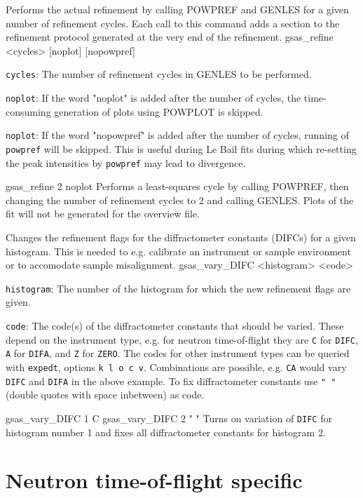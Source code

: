 {
Performs the actual refinement by calling POWPREF and GENLES for a given number of refinement cycles. Each call to this command adds a section to the refinement protocol generated at the very end of the refinement.
}{
gsas\_refine <cycles> [noplot] [nopowpref]
}{
\item \texttt{cycles}: The number of refinement cycles in GENLES to be performed.
\item \texttt{noplot}: If the word "noplot" is added after the number of cycles, the time-consuming generation of plots using POWPLOT is skipped.
\item \texttt{noplot}: If the word "nopowpref" is added after the number of cycles, running of \texttt{powpref} will be skipped. This is useful during Le Bail fits during which re-setting the peak intensities by \texttt{powpref} may lead to divergence.
}{
gsas\_refine 2 noplot
}{
Performs a least-squares cycle by calling POWPREF, then changing the number of refinement cycles to 2 and calling GENLES. Plots of the fit will not be generated for the overview file.
}

{
Changes the refinement flags for the diffractometer constants (DIFCs) for a given histogram. This is needed to e.g. calibrate an instrument or sample environment or to accomodate sample misalignment.
}{
gsas\_vary\_DIFC <histogram> <code>
}{
\item \texttt{histogram}: The number of the histogram for which the new refinement flags are given.
\item \texttt{code}: The code(s) of the diffractometer constants that should be varied. These depend on the instrument type, e.g. for neutron time-of-flight they are \texttt{C} for \texttt{DIFC}, \texttt{A} for \texttt{DIFA}, and \texttt{Z} for \texttt{ZERO}. The codes for other instrument types can be queried with \texttt{expedt}, options \texttt{k l o c v}. Combinations are possible, e.g. \texttt{CA} would vary \texttt{DIFC} and \texttt{DIFA} in the above example. To fix diffractometer constants use \texttt{" "} (double quotes with space inbetween) as code.
}{
gsas\_vary\_DIFC 1 C
\newline
gsas\_vary\_DIFC 2 " "
}{
Turns on variation of \texttt{DIFC} for histogram number 1 and fixes all diffractometer constants for histogram 2.
}

\section{Neutron time-of-flight specific}

